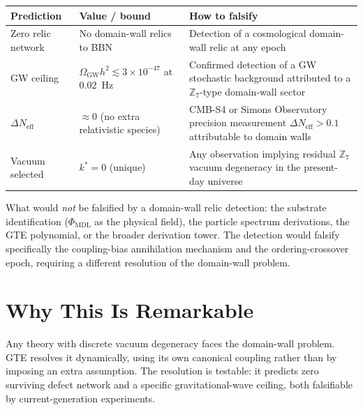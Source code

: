 \documentclass[11pt,a4paper]{article}
\newcommand{\PHIMDL}{\Phi_{\mathrm{MDL}}}
\newcommand{\ZS}{\mathbb{Z}_7}
\begin{document}
\begin{center}
\begin{tabular}{P{3.8cm} P{4.5cm} P{5.0cm}}
\toprule
\textbf{Prediction} & \textbf{Value / bound} & \textbf{How to falsify} \\
\midrule
Zero relic network & No domain-wall relics to BBN & Detection of a cosmological
  domain-wall relic at any epoch \\[6pt]
GW ceiling & $\Omega_\mathrm{GW} h^2 \lesssim 3\times10^{-47}$ at $0.02$~Hz &
  Confirmed detection of a GW stochastic background attributed to a
  $\ZS$-type domain-wall sector \\[6pt]
$\Delta N_\mathrm{eff}$ & $\approx 0$ (no extra relativistic species) &
  CMB-S4 or Simons Observatory precision measurement $\Delta N_\mathrm{eff}
  > 0.1$ attributable to domain walls \\[6pt]
Vacuum selected & $k^* = 0$ (unique) & Any observation implying residual
  $\ZS$ vacuum degeneracy in the present-day universe \\
\bottomrule
\end{tabular}
\end{center}

\noindent
What would \emph{not} be falsified by a domain-wall relic detection:
the substrate identification ($\PHIMDL$ as the physical field), the particle
spectrum derivations, the GTE polynomial, or the broader derivation tower.
The detection would falsify specifically the coupling-bias annihilation
mechanism and the ordering-crossover epoch, requiring a different resolution
of the domain-wall problem.

\section{Why This Is Remarkable}

\begin{tcolorbox}[colback=boxblue,colframe=blue!40!black,
  title=The three-sentence summary]
Any theory with discrete vacuum degeneracy faces the domain-wall problem.
GTE resolves it dynamically, using its own canonical coupling rather than by
imposing an extra assumption.
The resolution is testable: it predicts zero surviving defect network and a
specific gravitational-wave ceiling, both falsifiable by current-generation
experiments.
\end{tcolorbox}
\end{document}
